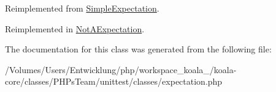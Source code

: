 Reimplemented from \hyperlink{class_simple_expectation_a15b69edf659c76f6543aa98d8d85b025}{SimpleExpectation}.



Reimplemented in \hyperlink{class_not_a_expectation_aecc6099e1b98a0b00f798e43a8add4fa}{NotAExpectation}.



The documentation for this class was generated from the following file:\begin{DoxyCompactItemize}
\item 
/Volumes/Users/Entwicklung/php/workspace\_\-koala\_/koala-\/core/classes/PHPsTeam/unittest/classes/expectation.php\end{DoxyCompactItemize}
